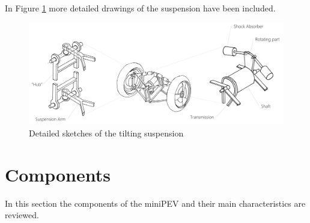 \\In Figure \ref{sketch_3} more detailed drawings of the suspension have been included.
\begin{figure}[h!]
	\includegraphics[width=1.0\linewidth]{figs/04/Imagen10}
	\caption{Detailed sketches of the tilting suspension}	
	\label{sketch_3}
\end{figure}

\newpage
\section{Components}

In this section the components of the miniPEV and their main characteristics are reviewed.


